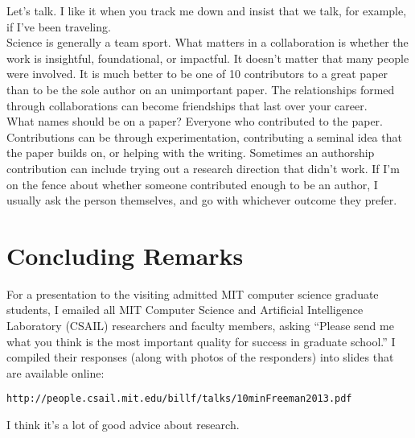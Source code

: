   Let's talk.  I
like it when you track me down and insist that we talk, for example,  if I've been traveling. \\


  Science is generally a team sport.   What matters in a collaboration is whether the work is insightful,  foundational, or impactful.  It doesn't matter that many people were involved.
It is much better to be one of 10 contributors to a great paper than to be the sole author on an unimportant paper. The relationships formed through collaborations can become friendships that last over your career. \\

  What names should be on a paper? Everyone who contributed to the paper.  Contributions can be through experimentation, contributing a seminal idea that the paper builds on, or helping with the writing.  Sometimes an authorship contribution can include trying out a research direction that didn't work. If I'm on the fence about whether someone contributed enough to be an author, I usually ask the person themselves, and go with whichever outcome they prefer.


\section{Concluding Remarks}


For a presentation to the visiting admitted MIT computer science graduate students, I
emailed all MIT Computer Science and Artificial Intelligence Laboratory (CSAIL) researchers and faculty members, asking ``Please send me   what you think is   the most important  quality for success in graduate school.''   I compiled their responses (along with photos of the responders) into slides that are available online:
\begin{verbatim}
http://people.csail.mit.edu/billf/talks/10minFreeman2013.pdf
\end{verbatim}
I think it's a lot of good advice about research.










